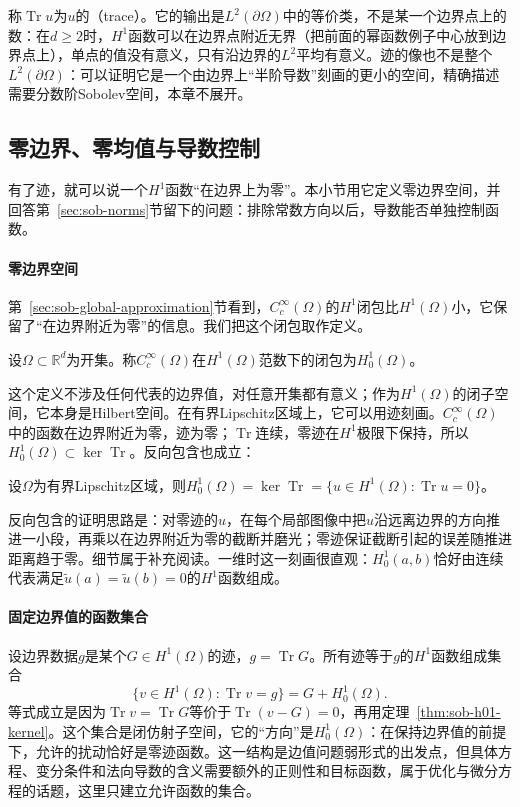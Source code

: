 称$\operatorname{Tr}u$为$u$的（trace）。它的输出是$L^2(\partial\Omega)$中的等价类，不是某一个边界点上的数：在$d\ge2$时，$H^1$函数可以在边界点附近无界（把前面的幂函数例子中心放到边界点上），单点的值没有意义，只有沿边界的$L^2$平均有意义。迹的像也不是整个$L^2(\partial\Omega)$：可以证明它是一个由边界上“半阶导数”刻画的更小的空间，精确描述需要分数阶Sobolev空间，本章不展开。

\subsection{零边界、零均值与导数控制}
\label{sec:sob-poincare}

有了迹，就可以说一个$H^1$函数“在边界上为零”。本小节用它定义零边界空间，并回答第~\ref{sec:sob-norms}节留下的问题：排除常数方向以后，导数能否单独控制函数。

\paragraph{零边界空间}
第~\ref{sec:sob-global-approximation}节看到，$C_c^\infty(\Omega)$的$H^1$闭包比$H^1(\Omega)$小，它保留了“在边界附近为零”的信息。我们把这个闭包取作定义。

\begin{definition}[零边界Sobolev空间]
\label{def:sob-h01}
设$\Omega\subset\mathbb R^d$为开集。称$C_c^\infty(\Omega)$在$H^1(\Omega)$范数下的闭包为$H_0^1(\Omega)$。
\end{definition}

这个定义不涉及任何代表的边界值，对任意开集都有意义；作为$H^1(\Omega)$的闭子空间，它本身是Hilbert空间。在有界Lipschitz区域上，它可以用迹刻画。$C_c^\infty(\Omega)$中的函数在边界附近为零，迹为零；$\operatorname{Tr}$连续，零迹在$H^1$极限下保持，所以$H_0^1(\Omega)\subset\ker\operatorname{Tr}$。反向包含也成立：

\begin{theorem}[零迹刻画]
\label{thm:sob-h01-kernel}
设$\Omega$为有界Lipschitz区域，则$H_0^1(\Omega)=\ker\operatorname{Tr}=\{u\in H^1(\Omega):\operatorname{Tr}u=0\}$。
\end{theorem}

反向包含的证明思路是：对零迹的$u$，在每个局部图像中把$u$沿远离边界的方向推进一小段，再乘以在边界附近为零的截断并磨光；零迹保证截断引起的误差随推进距离趋于零。细节属于补充阅读。一维时这一刻画很直观：$H_0^1(a,b)$恰好由连续代表满足$\tilde u(a)=\tilde u(b)=0$的$H^1$函数组成。

\paragraph{固定边界值的函数集合}
设边界数据$g$是某个$G\in H^1(\Omega)$的迹，$g=\operatorname{Tr}G$。所有迹等于$g$的$H^1$函数组成集合
\[
 \{v\in H^1(\Omega):\operatorname{Tr}v=g\}=G+H_0^1(\Omega).
\]
等式成立是因为$\operatorname{Tr}v=\operatorname{Tr}G$等价于$\operatorname{Tr}(v-G)=0$，再用定理~\ref{thm:sob-h01-kernel}。这个集合是闭仿射子空间，它的“方向”是$H_0^1(\Omega)$：在保持边界值的前提下，允许的扰动恰好是零迹函数。这一结构是边值问题弱形式的出发点，但具体方程、变分条件和法向导数的含义需要额外的正则性和目标函数，属于优化与微分方程的话题，这里只建立允许函数的集合。


